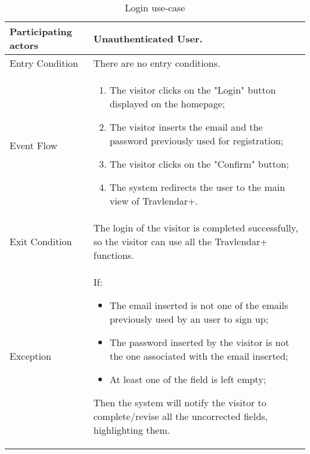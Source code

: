 \begin{table}[H]
	\begin{center}
		\begin{tabular}{ | p{} | p{} | }
		\hline
		Participating actors & Unauthenticated User.\\
		\hline
		Entry Condition & There are no entry conditions.\\
		\hline
		Event Flow & 
			\begin{enumerate}
				\item The visitor clicks on the "Login" button displayed on the homepage;
				\item The visitor inserts the email and the password previously used for registration;
				\item The visitor clicks on the "Confirm" button;
				\item The system redirects the user to the main view of Travlendar+.
			\end{enumerate} \\
		\hline
		Exit Condition & The login of the visitor is completed successfully, so the visitor can use all the Travlendar+ functions. \\
		\hline
		Exception & If:
				\begin{itemize}
   					\item The email inserted is not one of the emails previously used by an user to sign up;
   					\item The password inserted by the visitor is not the one associated with the email inserted;
   					\item At least one of the field is left empty;
   				\end{itemize}
   		Then the system will notify the visitor to complete/revise all the uncorrected fields, highlighting them.\\ 
		\hline
		\end{tabular}
	\end{center}
	\caption{Login use-case}
\end{table}